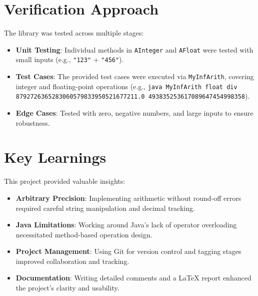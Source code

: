 \documentclass[a4paper,12pt]{article}
\begin{document}
\section{Verification Approach}
The library was tested across multiple stages:
\begin{itemize}
    \item \textbf{Unit Testing}: Individual methods in \texttt{AInteger} and \texttt{AFloat} were tested with small inputs (e.g., \texttt{"123"} + \texttt{"456"}).
    \item \textbf{Test Cases}: The provided test cases were executed via \texttt{MyInfArith}, covering integer and floating-point operations (e.g., \texttt{java MyInfArith float div 8792726365283060579833950521677211.0 493835253617089647454998358}).
    \item \textbf{Edge Cases}: Tested with zero, negative numbers, and large inputs to ensure robustness.
\end{itemize}

\section{Key Learnings}
This project provided valuable insights:
\begin{itemize}
    \item \textbf{Arbitrary Precision}: Implementing arithmetic without round-off errors required careful string manipulation and decimal tracking.
    \item \textbf{Java Limitations}: Working around Java's lack of operator overloading necessitated method-based operation design.
    \item \textbf{Project Management}: Using Git for version control and tagging stages improved collaboration and tracking.
    \item \textbf{Documentation}: Writing detailed comments and a LaTeX report enhanced the project's clarity and usability.
\end{itemize}

\end{document}
